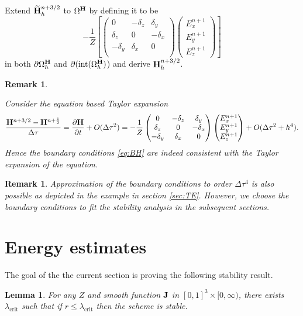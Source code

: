 \documentclass[12pt,reqno]{amsart}
\newcommand{\h}{{\bf H}}
\newcommand{\J}{{\bf J}}
\newtheorem{lemma}[theorem]{Lemma}
\newtheorem{rem}[theorem]{Remark}
\theoremstyle{definition}
\numberwithin{equation}{section}
\newcommand{\intr}[1]{\mathrm{int}(#1)}
\def\Gw{\Omega}     \def\Gx{\Xi}         \def\Gy{\Psi}
\def\Gwh{\Omega_h}
\begin{document}
		Extend $\widetilde{\h}_h^{n+3/2}$ 
	to $\Gw^\h$ by defining it to be 
	$$
		-\frac{1}{Z}
	\left[ 
	\begin{pmatrix}
		0& -\delta_z & \delta _y\\
		\delta_z&0&-\delta_x\\
		-\delta_y&\delta_x&0\\
	\end{pmatrix}
	\begin{pmatrix}
		E_x^{n+1}\\
		E_y^{n+1}\\
		E_z^{n+1}
	\end{pmatrix}\right]
	$$
	in both $\partial \Gwh^\h$ and $\partial (\intr{\Gwh^{\h}}$)
	and derive $\h_h^{n+3/2}$. 
	
	
\begin{rem}\label{rem:expB}


Consider the equation based  Taylor expansion
	$$
	\frac{\h^{n+3/2}-\h^{n+\frac{1}{2} } }{\Delta \tau}=
	\frac{\partial \h}{\partial t}+O(\Delta \tau ^2)=
	-\frac{1}{Z}	\begin{pmatrix}
		0& -\delta_z & \delta _y\\
		\delta_z&0&-\delta_x\\
		-\delta_y&\delta_x&0\\
	\end{pmatrix}
	\begin{pmatrix}
		E_x^{n+1}\\
		E_y^{n+1}\\
		E_z^{n+1}
	\end{pmatrix}+O(\Delta \tau^2+h^4).
	$$
	Hence the  boundary conditions \eqref{eq:BH} are 
 indeed consistent with the Taylor expansion of the equation.
\end{rem}
   
	\begin{rem}
	Approximation of the boundary conditions to order $\Delta \tau ^4$ is also possible as depicted in the example in section \ref{sec:TE}. However, we choose the boundary conditions to fit the stability analysis in the subsequent sections.
	\end{rem}

	


	

	\section{Energy estimates}
	The goal of the the current section is proving the following stability result.
	\begin{lemma}\label{lem:coer}
		For any $Z$ and smooth function $\J$ in $[0,1]^3\times [0,\infty)$, there exists 
		$\lambda_{\mathrm{crit}}$ such that if $r\leq \lambda_{\mathrm{crit}}$ then
 the scheme is stable.
 		\end{lemma}
 
\end{document}
